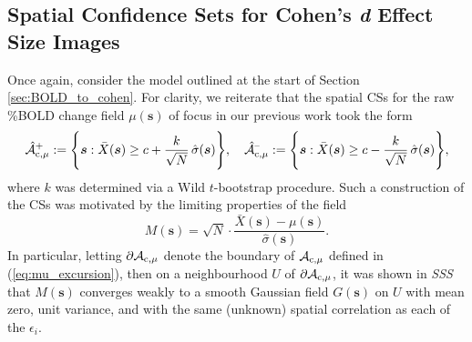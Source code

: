 \subsection{Spatial Confidence Sets for Cohen's \textit{d} Effect Size Images}
\label{sec:confidence_sets_for_cohens_d}
Once again, consider the model outlined at the start of Section {\ref{sec:BOLD_to_cohen}}. For clarity, we reiterate that the spatial CSs for the raw \%BOLD change field $\mu(\bm{s})$ of focus in our previous work took the form
\begin{equation}
\label{eq:mu_CSs_again}
\operatorname{\hat{\mathcal{A}}_{c,\mu}^+} := \Bigg\{\bm{s} : \bar{X}(\bm{s}) \geq c + \frac{k}{\sqrt{N}}\, \hat{\sigma}(\bm{s}) \Bigg\}, \quad \operatorname{\hat{\mathcal{A}}_{c,\mu}^{\textrm{--}}} := \Bigg\{\bm{s} : \bar{X}(\bm{s}) \geq c - \frac{k}{\sqrt{N}} \,\hat{\sigma}(\bm{s})  \Bigg\},
\end{equation}
where $k$ was determined via a Wild $t$-bootstrap procedure. Such a construction of the CSs was motivated by the limiting properties of the field
\begin{equation}
\label{eq:percent_BOLD_normalised error_field}
M(\bm{s}) = \sqrt{N} \cdot \frac{\bar{X}(\bm{s}) - \mu(\bm{s})}{\hat{\sigma}(\bm{s})}.
\end{equation}
In particular, letting $\operatorname{\partial\mathcal{A}_{c,\mu}}$ denote the boundary of $\operatorname{\mathcal{A}_{c,\mu}}$ defined in (\ref{eq:mu_excursion}), then on a neighbourhood $U$ of $\operatorname{\partial\mathcal{A}_{c,\mu}}$, it was shown in \textit{SSS} that $M(\bm{s})$ converges weakly to a smooth Gaussian field $G(\bm{s})$ on $U$ with mean zero, unit variance, and with the same (unknown) spatial correlation as each of the $\epsilon_{i}$. 

